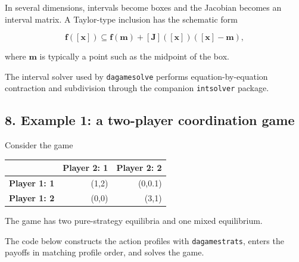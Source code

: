 \documentclass[11pt]{article}
\begin{document}
In several dimensions, intervals become boxes and the Jacobian becomes
an interval matrix. A Taylor-type inclusion has the schematic form

\[
\mathbf{f}([\mathbf{x}])
\subseteq
\mathbf{f}(\mathbf{m})
+
[\mathbf{J}]([\mathbf {x}])([\mathbf{x}]-\mathbf{m}),
\]

where \(\mathbf{m}\) is typically a point such as the midpoint of the
box.

The interval solver used by \texttt{dagamesolve} performs
equation-by-equation contraction and subdivision through the companion
\texttt{intsolver} package.

    \hypertarget{example-1-a-two-player-coordination-game}{%
\subsection{8. Example 1: a two-player coordination
game}\label{example-1-a-two-player-coordination-game}}

Consider the game

\begin{longtable}[]{@{}lrr@{}}
\toprule
& Player 2: 1 & Player 2: 2 \\
\midrule
\endhead
\textbf{Player 1: 1} & (1,2) & (0,0.1) \\
\textbf{Player 1: 2} & (0,0) & (3,1) \\
\bottomrule
\end{longtable}

The game has two pure-strategy equilibria and one mixed equilibrium.

The code below constructs the action profiles with
\texttt{dagamestrats}, enters the payoffs in matching profile order, and
solves the game.
\end{document}
